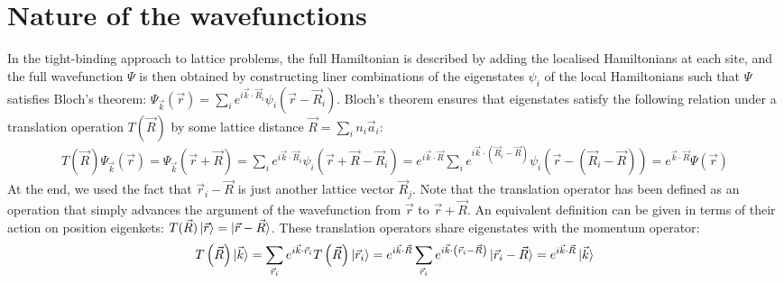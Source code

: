 \documentclass[prb]{revtex4-2}
\begin{document}
\section{Nature of the wavefunctions}
In the tight-binding approach to lattice problems, the full Hamiltonian is described by adding the localised Hamiltonians at each site, and the full wavefunction \(\Psi\) is then obtained by constructing liner combinations of the eigenstates \(\psi_i\) of the local Hamiltonians such that \(\Psi\) satisfies Bloch's theorem: \(\Psi_{\vec k}(\vec r) = \sum_i e^{i \vec{k}\cdot\vec{R}_i} \psi_i(\vec r - \vec R_i)\). Bloch's theorem ensures that eigenstates satisfy the following relation under a translation operation \(T(\vec R)\) by some lattice distance \(\vec R = \sum_i n_i \vec a_i\):
\begin{equation}\begin{aligned}
T(\vec R)\Psi_{\vec k}\left(\vec r\right) = \Psi_{\vec k}(\vec r + \vec R) = \sum_i e^{i \vec{k}\cdot\vec{R}_i} \psi_i(\vec r + \vec R - \vec R_i) = e^{i \vec{k}\cdot\vec{R}}\sum_i e^{i \vec{k}\cdot\left(\vec{R}_i - \vec R\right)} \psi_i(\vec r - (\vec R_i - \vec R)) = e^{\vec{k}\cdot\vec{R}}\Psi(\vec r)
\end{aligned}\end{equation}
At the end, we used the fact that \(\vec r_i - \vec R\) is just another lattice vector \(\vec R_j\). Note that the translation operator has been defined as an operation that simply advances the argument of the wavefunction from \(\vec r\) to \(\vec r + \vec R\). An equivalent definition can be given in terms of their action on position eigenkets: \(T(\vec R)\ket{\vec r} = \ket{\vec r - \vec R}\). These translation operators share eigenstates with the momentum operator:
\begin{equation}\begin{aligned}
	T\left( \vec R \right) \ket{\vec k} = \sum_{\vec r_i} e^{i \vec{k}\cdot\vec{r}_i}T\left( \vec R \right)\ket{\vec r_i} = e^{i \vec{k}\cdot\vec{R}}\sum_{\vec r_i} e^{i \vec{k}\cdot\left(\vec{r}_i - \vec R\right)}\ket{\vec r_i - \vec R} = e^{i \vec{k}\cdot\vec{R}} \ket{\vec k}
\end{aligned}\end{equation}
\end{document}
